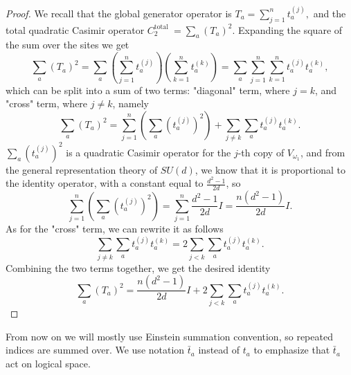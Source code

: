 \documentclass[10pt,twocolumn,superscriptaddress,aps,amsmath,amssymb,citeautoscript,floatfix,prx]{revtex4-2}
\theoremstyle{plain}
\theoremstyle{plain}
\theoremstyle{plain}
\theoremstyle{plain}
\theoremstyle{plain}
\theoremstyle{plain}
\theoremstyle{plain}
\theoremstyle{definition}
\theoremstyle{plain}
\begin{document}
\begin{appendix}
\begin{proof}
    We recall that the global generator operator is
    $
        T_a=\sum_{j=1}^n t^{(j)}_a,
    $
    and the total quadratic Casimir operator
    $
        C_2^{\text {total }}=\sum_a\left(T_a\right)^2.
    $
    Expanding the square of the sum over the sites we get
    \[
        \sum_a\left(T_a\right)^2=\sum_a\left(\sum_{j=1}^n t^{(j)}_a\right)\left(\sum_{k=1}^n t^{(k)}_a\right)=\sum_a \sum_{j=1}^n \sum_{k=1}^n t^{(j)}_a t^{(k)}_a,
    \]
    which can be split into a sum of two terms: "diagonal" term, where $j=k$, and "cross" term, where $j \neq k$, namely
    \[
        \sum_a\left(T_a\right)^2=\sum_{j=1}^n\left(\sum_a\left(t^{(j)}_a\right)^2\right)+\sum_{j \neq k} \sum_a t^{(j)}_a t^{(k)}_a.
    \]
    $\sum_a\left(t^{(j)}_a\right)^2$ is a quadratic Casimir operator for the $j$-th copy of $V_{\omega_1}$, and from the general 
    representation theory of $SU(d)$, we know that it is proportional to the identity operator, with a constant equal to $\frac{d^2-1}{2 d}$, so
    \[
        \sum_{j=1}^n\left(\sum_a\left(t^{(j)}_a\right)^2\right)=\sum_{j=1}^n \frac{d^2-1}{2 d} I=\frac{n\left(d^2-1\right)}{2 d} I.
    \]
    As for the "cross" term, we can rewrite it as follows
    \[
        \sum_{j \neq k} \sum_a t^{(j)}_a t^{(k)}_a=2 \sum_{j<k} \sum_a t^{(j)}_a t^{(k)}_a.
    \]
    Combining the two terms together, we get the desired identity
    \[
        \sum_a\left(T_a\right)^2=\frac{n\left(d^2-1\right)}{2 d} I+2 \sum_{j<k} \sum_a t^{(j)}_a t^{(k)}_a.
    \]
\end{proof}

From now on we will mostly use Einstein summation convention, so repeated indices are summed over.
We use notation $\bar{t}_a$ instead of $t_a$ to emphasize that $\bar{t}_a$ act on logical space.


\end{appendix}
\end{document}
